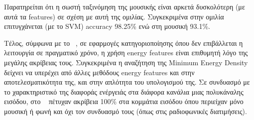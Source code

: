 Παρατηρείται ότι η σωστή ταξινόμηση της μουσικής είναι αρκετά δυσκολότερη (με
αυτά τα features) σε σχέση με αυτή της ομιλίας. Συγκεκριμένα στην ομιλία
επιτυγχάνεται (με το SVM) accuracy 98.25\% ενώ στη μουσική 93.1\%.

\vspace{1em}
Τέλος, σύμφωνα με το ~\cite{radio}, σε εφαρμογές κατηγοριοποίησης όπου δεν
επιβάλλεται η λειτουργία σε πραγματικό χρόνο, η χρήση energy features είναι
επιθυμητή λόγο της μεγάλης ακρίβειας τους. Συγκεκριμένα η αναζήτηση της Minimum
Energy Density δείχνει να υπερέχει από άλλες μεθόδους energy features και στην
αποτελεσματικότητα της, και στην απλότητα του υπολογισμού της. Σε συνδυασμό με το
χαρακτηριστικό της διαφοράς ενέργειάς στα διάφορα κανάλια μιας πολυκάναλης
εισόδου, στο ~\cite{radio} πέτυχαν ακρίβεια 100\% στα κομμάτια εισόδου όπου
περιείχαν μόνο μουσική ή φωνή και όχι τον συνδυασμό τους (όπως στις ραδιοφωνικές
διατιμήσεις).
